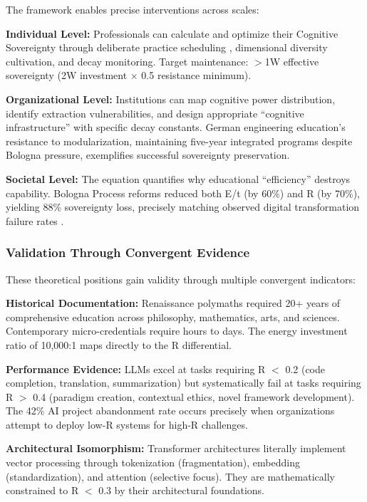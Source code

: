The framework enables precise interventions across scales:

\textbf{Individual Level:} Professionals can calculate and optimize their Cognitive Sovereignty through deliberate practice scheduling \citep{ericsson1993}, dimensional diversity cultivation, and decay monitoring. Target maintenance: $>$1W effective sovereignty (2W investment $\times$ 0.5 resistance minimum).

\textbf{Organizational Level:} Institutions can map cognitive power distribution, identify extraction vulnerabilities, and design appropriate ``cognitive infrastructure'' with specific decay constants. German engineering education's resistance to modularization, maintaining five-year integrated programs despite Bologna pressure, exemplifies successful sovereignty preservation.

\textbf{Societal Level:} The equation quantifies why educational ``efficiency'' destroys capability. Bologna Process reforms reduced both E/t (by 60\%) and R (by 70\%), yielding 88\% sovereignty loss, precisely matching observed digital transformation failure rates \citep{bain2024}.

\subsubsection{Validation Through Convergent Evidence}

These theoretical positions gain validity through multiple convergent indicators:

\textbf{Historical Documentation:} Renaissance polymaths required 20+ years of comprehensive education across philosophy, mathematics, arts, and sciences. Contemporary micro-credentials require hours to days. The energy investment ratio of 10,000:1 maps directly to the R differential.

\textbf{Performance Evidence:} LLMs excel at tasks requiring R $<$ 0.2 (code completion, translation, summarization) but systematically fail at tasks requiring R $>$ 0.4 (paradigm creation, contextual ethics, novel framework development). The 42\% AI project abandonment rate occurs precisely when organizations attempt to deploy low-R systems for high-R challenges.

\textbf{Architectural Isomorphism:} Transformer architectures literally implement vector processing through tokenization (fragmentation), embedding (standardization), and attention (selective focus). They are mathematically constrained to R $<$ 0.3 by their architectural foundations.

